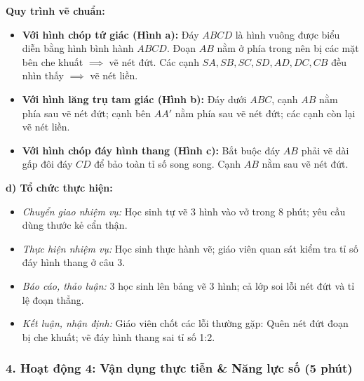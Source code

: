 \documentclass[12pt, a4paper]{article}
\begin{document}
\begin{center}
\end{center}

\textbf{Quy trình vẽ chuẩn:}
\begin{itemize}[leftmargin=0.6cm]
    \item \textbf{Với hình chóp tứ giác (Hình a):} Đáy $ABCD$ là hình vuông được biểu diễn bằng hình bình hành $ABCD$. Đoạn $AB$ nằm ở phía trong nên bị các mặt bên che khuất $\implies$ vẽ nét đứt. Các cạnh $SA, SB, SC, SD, AD, DC, CB$ đều nhìn thấy $\implies$ vẽ nét liền.
    \item \textbf{Với hình lăng trụ tam giác (Hình b):} Đáy dưới $ABC$, cạnh $AB$ nằm phía sau vẽ nét đứt; cạnh bên $AA'$ nằm phía sau vẽ nét đứt; các cạnh còn lại vẽ nét liền.
    \item \textbf{Với hình chóp đáy hình thang (Hình c):} Bắt buộc đáy $AB$ phải vẽ dài gấp đôi đáy $CD$ để bảo toàn tỉ số song song. Cạnh $AB$ nằm sau vẽ nét đứt.
\end{itemize}

\noindent \textbf{d) Tổ chức thực hiện:}
\begin{itemize}[leftmargin=0.8cm]
    \item \textit{Chuyển giao nhiệm vụ:} Học sinh tự vẽ 3 hình vào vở trong 8 phút; yêu cầu dùng thước kẻ cẩn thận.
    \item \textit{Thực hiện nhiệm vụ:} Học sinh thực hành vẽ; giáo viên quan sát kiểm tra tỉ số đáy hình thang ở câu 3.
    \item \textit{Báo cáo, thảo luận:} 3 học sinh lên bảng vẽ 3 hình; cả lớp soi lỗi nét đứt và tỉ lệ đoạn thẳng.
    \item \textit{Kết luận, nhận định:} Giáo viên chốt các lỗi thường gặp: Quên nét đứt đoạn bị che khuất; vẽ đáy hình thang sai tỉ số 1:2.
\end{itemize}

\subsubsection*{4. Hoạt động 4: Vận dụng thực tiễn & Năng lực số (5 phút)}
\end{document}
